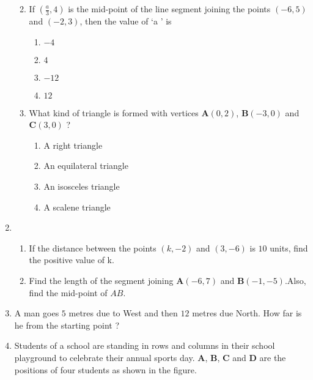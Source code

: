 \documentclass{article}
\let\vec\mathbf
\begin{document}
\begin{enumerate}
\begin{enumerate}[label=(\roman*)]
\begin{enumerate}[label=(\Alph*)]
			    \end{enumerate}
		    \item If $(\frac{a}{3},4)$ is the mid-point of the line segment joining the points $(-6, 5)$ and $(-2, 3)$, then the value of \lq a \rq{} is

			    \begin{enumerate}[label=(\Alph*)]
				    \item $-4$
				    \item $4$
				    \item $-12$
				    \item $12$
			    \end{enumerate}
		    \item What kind of triangle is formed with vertices $\vec{A}(0, 2)$, $\vec{B}(-3, 0)$ and $\vec{C}(3, 0)$ ?
			    \begin{enumerate}[label=(\Alph*)]
				    \item A right triangle
				    \item An equilateral triangle
				    \item An isosceles triangle
				    \item A scalene triangle
			    \end{enumerate}

	     \end{enumerate}
     \item \begin{enumerate}[label=(\alph*)]
		     \item If the distance between the points $(k, -2)$ and $(3, -6)$ is $10$ units, find the positive value of k.
		     \item Find the length of the segment joining $\vec{A}(-6, 7)$ and $\vec{B}(-1, -5)$.Also, find the mid-point of $AB$. 

     \end{enumerate}
     \item A man goes $5$ metres due to West and then $12$ metres due North. How far is he from the starting point ?
     \item Students of a school are standing in rows and columns in their school playground to celebrate their annual sports day. $\vec{A}$, $\vec{B}$, $\vec{C}$ and $\vec{D}$ are the positions of four students as shown in the figure. \\
	     

\end{enumerate}
\end{document}
